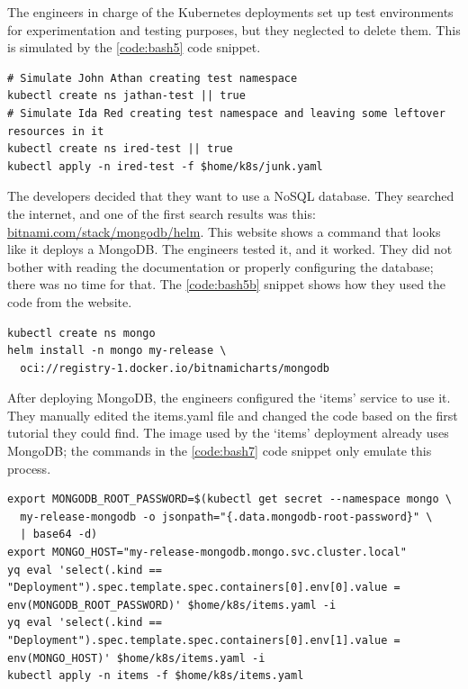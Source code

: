 The engineers in charge of the Kubernetes deployments set up test environments for experimentation and testing purposes, but they neglected to delete them. This is simulated by the \ref{code:bash5} code snippet.

\begin{minipage}{\linewidth}
\begin{lstlisting}[caption={Simulate leftover resources},language=mybash,label=code:bash5]
# Simulate John Athan creating test namespace
kubectl create ns jathan-test || true
# Simulate Ida Red creating test namespace and leaving some leftover resources in it
kubectl create ns ired-test || true
kubectl apply -n ired-test -f $home/k8s/junk.yaml
\end{lstlisting}
\end{minipage}

The developers decided that they want to use a NoSQL database. They searched the internet, and one of the first search results was this: \url{bitnami.com/stack/mongodb/helm}. This website shows a command that looks like it deploys a MongoDB. The engineers tested it, and it worked. They did not bother with reading the documentation or properly configuring the database; there was no time for that. The \ref{code:bash5b} snippet shows how they used the code from the website.

\begin{lstlisting}[caption={Deploy MongoDB},language=mybash,label=code:bash5b]
kubectl create ns mongo
helm install -n mongo my-release \
  oci://registry-1.docker.io/bitnamicharts/mongodb
\end{lstlisting}

After deploying MongoDB, the engineers configured the `items' service to use it. They manually edited the items.yaml file and changed the code based on the first tutorial they could find. The image used by the `items' deployment already uses MongoDB; the commands in the \ref{code:bash7} code snippet only emulate this process.

\begin{lstlisting}[caption={Configuring the `items' app to use MongoDB},language=mybash,label=code:bash7]
export MONGODB_ROOT_PASSWORD=$(kubectl get secret --namespace mongo \
  my-release-mongodb -o jsonpath="{.data.mongodb-root-password}" \
  | base64 -d)
export MONGO_HOST="my-release-mongodb.mongo.svc.cluster.local"
yq eval 'select(.kind == "Deployment").spec.template.spec.containers[0].env[0].value = env(MONGODB_ROOT_PASSWORD)' $home/k8s/items.yaml -i
yq eval 'select(.kind == "Deployment").spec.template.spec.containers[0].env[1].value = env(MONGO_HOST)' $home/k8s/items.yaml -i
kubectl apply -n items -f $home/k8s/items.yaml
\end{lstlisting}

